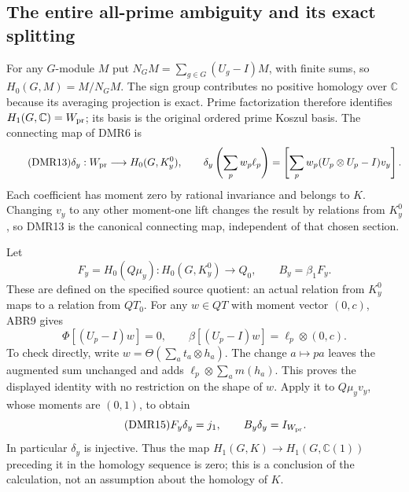 \subsection{The entire all-prime ambiguity and its exact splitting}

For any $G$-module $M$ put
$N_GM=\sum_{g\in G}(U_g-I)M$, with finite sums, so
$H_0(G,M)=M/N_GM$. The sign group contributes no positive
homology over $\mathbb C$ because its averaging projection is
exact. Prime factorization therefore identifies
$H_1(G,\mathbb C)=W_{\rm pr}$; its basis is the original ordered
prime Koszul basis. The connecting map of DMR6 is
\begin{equation}\tag{DMR13}
\delta_y:W_{\rm pr}\longrightarrow H_0(G,K_y^0),\qquad
\delta_y\left(\sum_pw_p\ell_p\right)
   =\left[\sum_pw_p(U_p\otimes U_p-I)v_y\right].
\end{equation}
Each coefficient has moment zero by rational invariance and
belongs to $K$. Changing $v_y$ to any other moment-one lift
changes the result by relations from $K_y^0$, so DMR13 is the
canonical connecting map, independent of that chosen section.

Let
\begin{equation}\tag{DMR14}
F_y=H_0(Q\mu_y):H_0(G,K_y^0)\longrightarrow Q_0,
\qquad B_y=\beta_1F_y.
\end{equation}
These are defined on the specified source quotient: an actual
relation from $K_y^0$ maps to a relation from $QT_0$.
For any $w\in QT$ with moment vector $(0,c)$, ABR9 gives
\[
\Phi[(U_p-I)w]=0,\qquad
\beta[(U_p-I)w]=\ell_p\otimes(0,c).
\]
To check directly, write $w=\Theta(\sum_at_a\otimes h_a)$.
The change $a\mapsto pa$ leaves the augmented sum unchanged
and adds $\ell_p\otimes\sum_am(h_a)$. This proves the
displayed identity with no restriction on the shape of $w$.
Apply it to $Q\mu_yv_y$, whose moments are $(0,1)$, to obtain
\begin{equation}\tag{DMR15}
F_y\delta_y=j_1,\qquad B_y\delta_y=I_{W_{\rm pr}}.
\end{equation}
In particular $\delta_y$ is injective. Thus the map
$H_1(G,K)\to H_1(G,\mathbb C(1))$ preceding it in the homology
sequence is zero; this is a conclusion of the calculation, not
an assumption about the homology of $K$.

